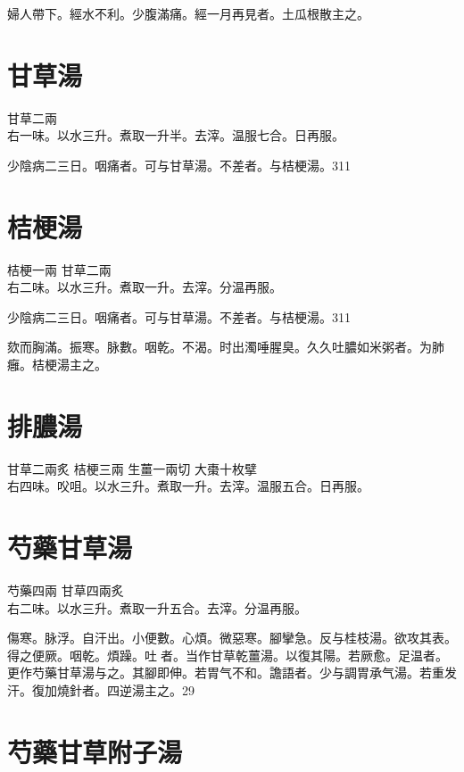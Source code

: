 {\khaaitp 婦人}帶下。經水不利。少腹滿痛。經一月再見者。土瓜根散主之。

\section{甘草湯}

甘草{\scriptsize 二兩}\\
右一味。以水三升。煮取一升半。去滓。温服七合。日再服。

少陰病二三日。咽痛者。可与甘草湯。不差者。与桔梗湯。311

\section{桔梗湯}

桔梗{\scriptsize 一兩} 甘草{\scriptsize 二兩}\\
右二味。以水三升。煮取一升。去滓。分温再服。

少陰病二三日。咽痛者。可与甘草湯。不差者。与桔梗湯。311

欬而胸滿。振寒。脉數。咽乾。不渴。时出濁唾腥臭。久久吐膿如米粥者。为肺癰。桔梗湯主之。

\section{排膿湯}

甘草{\scriptsize 二兩炙} 桔梗{\scriptsize 三兩} 生薑{\scriptsize 一兩切} 大棗{\scriptsize 十枚擘}\\
右四味。㕮咀。以水三升。煮取一升。去滓。温服五合。日再服。

\section{芍藥甘草湯}

芍藥{\scriptsize 四兩} 甘草{\scriptsize 四兩炙}\\
右二味。以水三升。煮取一升五合。去滓。分温再服。

傷寒。脉浮。自汗出。小便數。心煩。微惡寒。腳攣急。反与桂枝湯。欲攻其表。得之便厥。咽乾。煩躁。吐{\sungtpii 𠱘}者。当作甘草乾薑湯。以復其陽。若厥愈。足温者。更作芍藥甘草湯与之。其腳即伸。若胃气不和。譫語者。少与{\khaaitp 調胃}承气湯。若重发汗。復加燒針者。四逆湯主之。29

\section{芍藥甘草附子湯}

